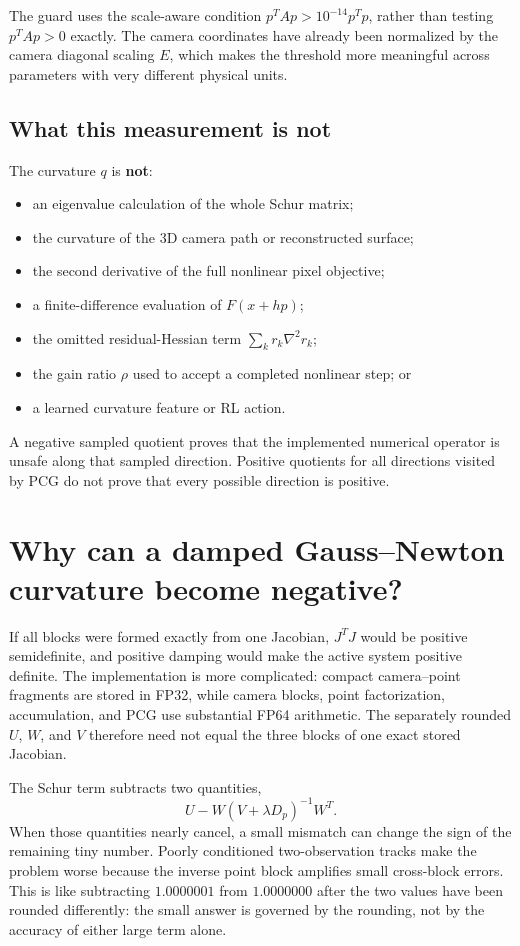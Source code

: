 \documentclass[11pt]{article}
\begin{document}
The guard uses the scale-aware condition $p^TAp>10^{-14}p^Tp$, rather than testing $p^TAp>0$ exactly.  The camera coordinates have already been normalized by the camera diagonal scaling $E$, which makes the threshold more meaningful across parameters with very different physical units.

\subsection{What this measurement is not}

The curvature $q$ is \textbf{not}:

\begin{itemize}
  \item an eigenvalue calculation of the whole Schur matrix;
  \item the curvature of the 3D camera path or reconstructed surface;
  \item the second derivative of the full nonlinear pixel objective;
  \item a finite-difference evaluation of $F(x+hp)$;
  \item the omitted residual-Hessian term $\sum_k r_k\nabla^2r_k$;
  \item the gain ratio $\rho$ used to accept a completed nonlinear step; or
  \item a learned curvature feature or RL action.
\end{itemize}

A negative sampled quotient proves that the implemented numerical operator is unsafe along that sampled direction.  Positive quotients for all directions visited by PCG do not prove that every possible direction is positive.

\section{Why can a damped Gauss--Newton curvature become negative?}

If all blocks were formed exactly from one Jacobian, $J^TJ$ would be positive semidefinite, and positive damping would make the active system positive definite.  The implementation is more complicated: compact camera--point fragments are stored in FP32, while camera blocks, point factorization, accumulation, and PCG use substantial FP64 arithmetic.  The separately rounded $U$, $W$, and $V$ therefore need not equal the three blocks of one exact stored Jacobian.

The Schur term subtracts two quantities,
\[
  U-W(V+\lambda D_p)^{-1}W^T.
\]
When those quantities nearly cancel, a small mismatch can change the sign of the remaining tiny number.  Poorly conditioned two-observation tracks make the problem worse because the inverse point block amplifies small cross-block errors.  This is like subtracting $1.0000001$ from $1.0000000$ after the two values have been rounded differently: the small answer is governed by the rounding, not by the accuracy of either large term alone.
\end{document}
